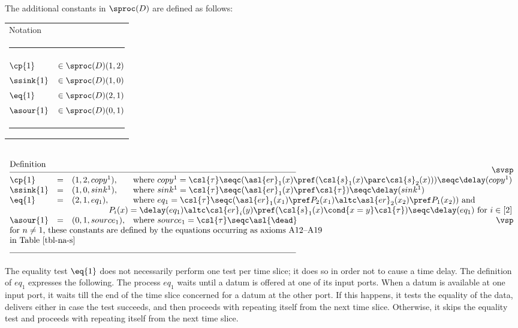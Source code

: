 \documentclass[fleqn]{llncs}
\begin{document}
The additional constants in $\sproc(D)$ are defined as follows:
\begin{center}
\footnotesize
\begin{tabular}{ll}
\multicolumn{2}{l}{Notation} \\[-1.25ex]
\multicolumn{2}{l}{\rule{.99\textwidth}{.125mm}} \svsp \\
$\cp{1}$    & $\in \sproc(D)(1,2)$ \\
$\ssink{1}$ & $\in \sproc(D)(1,0)$ \\
$\eq{1}$    & $\in \sproc(D)(2,1)$ \\
$\asour{1}$ & $\in \sproc(D)(0,1)$ \\
\multicolumn{2}{l}{\rule{.99\textwidth}{.125mm}}
\end{tabular}
\svsp \\
$
\begin{array}{llll}
\multicolumn{4}{l}{\mbox{Definition}} \\[-1.25ex]
\multicolumn{4}{l}{\rule{.99\textwidth}{.125mm}} \svsp \\
\cp{1}    & = & (1,2,copy^1),   &
\multicolumn{1}{l}{\mbox{where }
 copy^1 =
  \csl{\tau} \seqc
  (\asl{er}_1(x) \pref (\csl{s}_1(x) \parc \csl{s}_2(x))) \seqc
  \delay(copy^1)} \\
\ssink{1} & = & (1,0,sink^1),   &
\multicolumn{1}{l}{\mbox{where }
 sink^1 =
  \csl{\tau} \seqc
  (\asl{er}_1(x) \pref \csl{\tau}) \seqc \delay(sink^1)} \\
\eq{1}    & = & (2,1,eq_1),     &
\multicolumn{1}{l}{\mbox{where }
 eq_1 =
  \csl{\tau} \seqc
  (\asl{er}_1(x_1) \pref P_2(x_1) \altc
   \asl{er}_2(x_2) \pref P_1(x_2)) \mbox{ and}} \\
\multicolumn{4}{r}{
 P_i(x) =
      \delay(eq_1) \altc
      \csl{{er}}_i(y) \pref (\csl{s}_1(x) \cond{x = y} \csl{\tau}) \seqc
      \delay(eq_1)
 \mbox{ for $i \in [2]$}} \\
\asour{1} & = & (0,1,source_1), &
\multicolumn{1}{l}{\mbox{where }
 source_1 = \csl{\tau} \seqc \asl{\dead}} \vsp \\
\multicolumn{4}{l}{
\mbox{for $n \neq 1$, these constants are defined by the equations
occurring as axioms A12--A19}} \\
\multicolumn{4}{l}{\mbox{in Table~\ref{tbl-na-s}}} \\
\multicolumn{4}{l}{\rule{.99\textwidth}{.125mm}}
\end{array}
$
\end{center}
\edfn
The equality test $\eq{1}$ does not necessarily perform one test per
time slice; it does so in order not to cause a time delay.
The definition of $eq_1$ expresses the following.
The process $eq_1$ waits until a datum is offered at one of its input
ports.
When a datum is available at one input port, it waits till the end of
the time slice concerned for a datum at the other port.
If this happens, it tests the equality of the data, delivers either in
case the test succeeds, and then proceeds with repeating itself from the
next time slice.
Otherwise, it skips the equality test and proceeds with repeating itself
from the next time slice.
\end{document}
